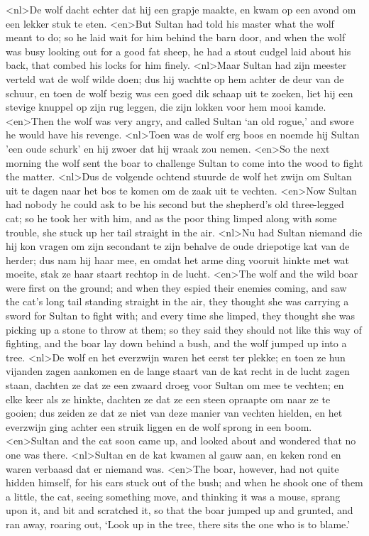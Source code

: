 <nl>De wolf dacht echter dat hij een grapje maakte, en kwam op een avond om een lekker stuk te eten.
<en>But Sultan had told his master what the wolf meant to do; so he laid wait for him behind the barn door, and when the wolf was busy looking out for a good fat sheep, he had a stout cudgel laid about his back, that combed his locks for him finely.
<nl>Maar Sultan had zijn meester verteld wat de wolf wilde doen; dus hij wachtte op hem achter de deur van de schuur, en toen de wolf bezig was  een goed dik schaap uit te zoeken, liet hij een stevige knuppel op zijn rug leggen, die zijn lokken voor hem mooi kamde.
<en>Then the wolf was very angry, and called Sultan ‘an old rogue,’ and swore he would have his revenge.
<nl>Toen was de wolf erg boos en noemde hij Sultan 'een oude schurk' en hij zwoer dat hij wraak zou nemen.
<en>So the next morning the wolf sent the boar to challenge Sultan to come into the wood to fight the matter.
<nl>Dus de volgende ochtend stuurde de wolf het zwijn om Sultan uit te dagen naar het bos te komen om de zaak uit te vechten.
<en>Now Sultan had nobody he could ask to be his second but the shepherd’s old three-legged cat; so he took her with him, and as the poor thing limped along with some trouble, she stuck up her tail straight in the air.
<nl>Nu had Sultan niemand die hij kon vragen om zijn secondant te zijn behalve de oude driepotige kat van de herder; dus nam hij haar mee, en omdat het arme ding vooruit hinkte met wat moeite, stak ze haar staart rechtop in de lucht.
<en>The wolf and the wild boar were first on the ground; and when they espied their enemies coming, and saw the cat’s long tail standing straight in the air, they thought she was carrying a sword for Sultan to fight with; and every time she limped, they thought she was picking up a stone to throw at them; so they said they should not like this way of fighting, and the boar lay down behind a bush, and the wolf jumped up into a tree.
<nl>De wolf en het everzwijn waren het eerst ter plekke; en toen ze hun vijanden zagen aankomen en de lange staart van de kat recht in de lucht zagen staan, dachten ze dat ze een zwaard droeg voor Sultan om mee te vechten; en elke keer als ze hinkte, dachten ze dat ze een steen opraapte om naar ze te gooien; dus zeiden ze dat ze niet van deze manier van vechten hielden, en het everzwijn ging achter een struik liggen en de wolf sprong in een boom.
<en>Sultan and the cat soon came up, and looked about and wondered that no one was there.
<nl>Sultan en de kat kwamen al gauw aan, en keken rond en waren verbaasd dat er niemand was.
<en>The boar, however, had not quite hidden himself, for his ears stuck out of the bush; and when he shook one of them a little, the cat, seeing something move, and thinking it was a mouse, sprang upon it, and bit and scratched it, so that the boar jumped up and grunted, and ran away, roaring out, ‘Look up in the tree, there sits the one who is to blame.’
